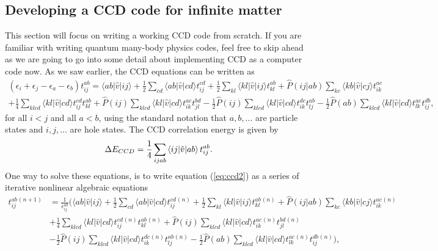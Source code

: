 \subsection{Developing a CCD code for infinite matter}
  This section will focus on writing a working CCD code from
  scratch. If you are familiar with writing quantum many-body physics
  codes, feel free to skip ahead as we are going to go into some
  detail about implementing CCD as a computer code now. As we saw
  earlier, the CCD equations can be written as
  \begin{align}
  \left(\epsilon_i+\epsilon_j-\epsilon_a-\epsilon_b\right)t_{ij}^{ab}
  = \langle ab \vert \hat{v} \vert ij \rangle+\frac{1}{2}\sum_{cd} \langle ab \vert \hat{v} \vert cd \rangle
  t_{ij}^{cd}+\frac{1}{2}\sum_{kl} \langle kl \vert \hat{v} \vert ij
  \rangle t_{kl}^{ab}+\hat{P}(ij\vert ab)\sum_{kc} \langle kb \vert
  \hat{v} \vert cj \rangle t_{ik}^{ac} & \nonumber
  \\ +\frac{1}{4}\sum_{klcd} \langle kl \vert \hat{v} \vert cd \rangle
  t_{ij}^{cd}t_{kl}^{ab}+\hat{P}(ij)\sum_{klcd} \langle kl \vert
  \hat{v} \vert cd \rangle t_{ik}^{ac}t_{jl}^{bd}-\frac{1}{2}\hat{P}(ij)\sum_{klcd} \langle kl \vert \hat{v} \vert
  cd \rangle t_{ik}^{dc}t_{lj}^{ab}-\frac{1}{2}\hat{P}(ab)\sum_{klcd}
  \langle kl \vert \hat{v} \vert cd \rangle t_{lk}^{ac}t_{ij}^{db},&
  \label{eq:ccd2}
  \end{align}
  for all $i < j$ and all $a < b$, using the standard notation that
  $a,b,...$ are particle states and $i,j,...$ are hole states. The CCD correlation energy is given by
  \begin{equation}
  \Delta E_{CCD} = \frac{1}{4} \sum_{ijab}
  \braket{ij|\hat{v}|ab}t^{ab}_{ij}.
  \label{eq:ccdcorr}
  \end{equation}
  One way to solve these equations, is to write equation
  (\ref{eq:ccd2}) as a series of iterative nonlinear algebraic
  equations
  \begin{align}
  t_{ij}^{ab}{}^{(n+1)}& = \frac{1}{\epsilon^{ab}_{ij}} \bigg(\langle
  ab \vert \hat{v} \vert ij \rangle +\frac{1}{2}\sum_{cd} \langle ab \vert \hat{v} \vert cd \rangle
  t_{ij}^{cd}{}^{(n)}+\frac{1}{2}\sum_{kl} \langle kl \vert \hat{v}
  \vert ij \rangle t_{kl}^{ab}{}^{(n)}+\hat{P}(ij\vert ab)\sum_{kc}
  \langle kb \vert \hat{v} \vert cj \rangle t_{ik}^{ac}{}^{(n)} & 
  \nonumber \\ & +\frac{1}{4}\sum_{klcd} \langle kl \vert \hat{v} \vert
  cd \rangle
  t_{ij}^{cd}{}^{(n)}t_{kl}^{ab}{}^{(n)}+\hat{P}(ij)\sum_{klcd}
  \langle kl \vert \hat{v} \vert cd \rangle
  t_{ik}^{ac}{}^{(n)}t_{jl}^{bd}{}^{(n)} \nonumber \\ &-\frac{1}{2}\hat{P}(ij)\sum_{klcd} \langle kl \vert \hat{v} \vert
  cd \rangle
  t_{ik}^{dc}{}^{(n)}t_{lj}^{ab}{}^{(n)}-\frac{1}{2}\hat{P}(ab)\sum_{klcd}
  \langle kl \vert \hat{v} \vert cd \rangle
  t_{lk}^{ac}{}^{(n)}t_{ij}^{db}{}^{(n)} \bigg),
  \label{eq:ccd3}
  \end{align}
